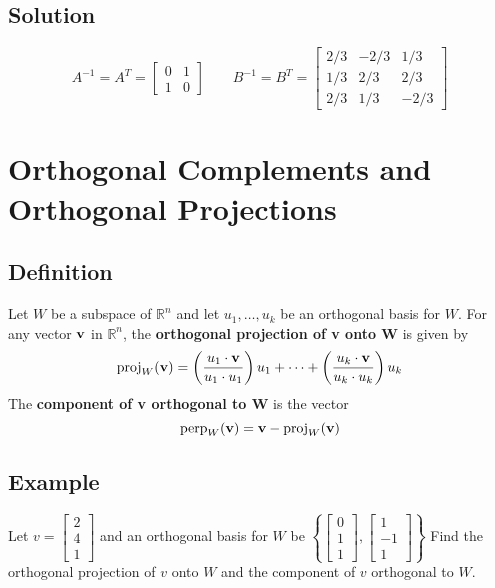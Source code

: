 \subsection*{Solution}
\[
    A^{-1}=A^T=\begin{bmatrix}
        0 & 1 \\
        1 & 0
    \end{bmatrix} \qquad
    B^{-1}=B^T=\begin{bmatrix}
        2/3 & -2/3 & 1/3  \\
        1/3 & 2/3  & 2/3  \\
        2/3 & 1/3  & -2/3
    \end{bmatrix}
\]

\section{Orthogonal Complements and Orthogonal Projections}

\subsection*{Definition}
Let $W$ be a subspace of $\mathbb{R}^n$ and let ${u_1, \dots ,u_k}$ be an
orthogonal basis for $W$. For any vector $\mathbf{v}$ in $\mathbb{R}^n$,
the \textbf{orthogonal projection of v onto W} is given by
\[\text{proj}_W(\mathbf{v})=\left(\frac{u_1\cdot\mathbf{v}}{u_1\cdot u_1}\right)u_1+\dots+
    \left(\frac{u_k\cdot\mathbf{v}}{u_k\cdot u_k}\right)u_k\]
The \textbf{component of v orthogonal to W} is the vector
\[\text{perp}_W(\mathbf{v})=\mathbf{v}-\text{proj}_W(\mathbf{v})\]

\subsection*{Example}
Let $v=\begin{bmatrix}
        2 \\4\\1
    \end{bmatrix}$ and an orthogonal basis for $W$ be $\left\{\begin{bmatrix}
        0 \\1\\1
    \end{bmatrix},\begin{bmatrix}
        1 \\-1\\1
    \end{bmatrix}\right\}$
Find the orthogonal projection of $v$ onto $W$ and the component of $v$ orthogonal to $W$.

